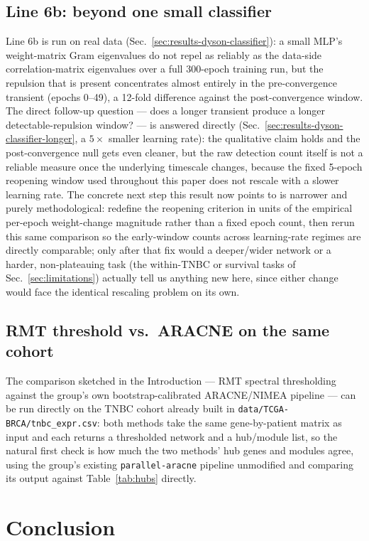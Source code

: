 \documentclass[11pt]{article}
\begin{document}
\subsection{Line 6b: beyond one small classifier}
Line 6b is run on real data (Sec.~\ref{sec:results-dyson-classifier}):
a small MLP's weight-matrix Gram eigenvalues do not repel as reliably
as the data-side correlation-matrix eigenvalues over a full 300-epoch
training run, but the repulsion that is present concentrates almost
entirely in the pre-convergence transient (epochs 0--49), a 12-fold
difference against the post-convergence window. The direct follow-up
question --- does a longer transient produce a longer
detectable-repulsion window? --- is answered directly
(Sec.~\ref{sec:results-dyson-classifier-longer}, a $5\times$ smaller
learning rate): the qualitative claim holds and the post-convergence
null gets even cleaner, but the raw detection count itself is not a
reliable measure once the underlying timescale changes, because the
fixed 5-epoch reopening window used throughout this paper does not
rescale with a slower learning rate. The concrete next step this result
now points to is narrower and purely methodological: redefine the
reopening criterion in units of the empirical per-epoch weight-change
magnitude rather than a fixed epoch count, then rerun this same
comparison so the early-window counts across learning-rate regimes are
directly comparable; only after that fix would a deeper/wider network
or a harder, non-plateauing task (the within-TNBC or survival tasks of
Sec.~\ref{sec:limitations}) actually tell us anything new here, since
either change would face the identical rescaling problem on its own.

\subsection{RMT threshold vs.\ ARACNE on the same cohort}
The comparison sketched in the Introduction --- RMT spectral thresholding
against the group's own bootstrap-calibrated ARACNE/NIMEA pipeline
--- can be run directly on the TNBC cohort already built in
\texttt{data/TCGA-BRCA/tnbc\_expr.csv}: both methods take the same
gene-by-patient matrix as input and each returns a thresholded network
and a hub/module list, so the natural first check is how much the two
methods' hub genes and modules agree, using the group's existing
\texttt{parallel-aracne} pipeline unmodified and comparing its output
against Table~\ref{tab:hubs} directly.

\section{Conclusion}
\end{document}

